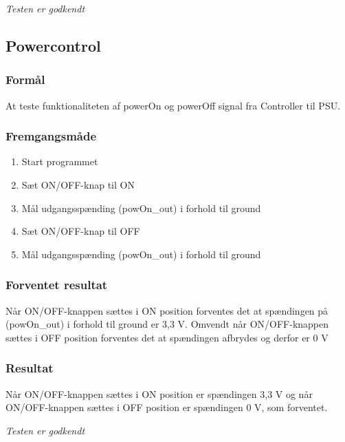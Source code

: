 \textit{Testen er godkendt}

\subsection*{Powercontrol}

\subsubsection*{Formål}
At teste funktionaliteten af powerOn og powerOff signal fra Controller til PSU.

\subsubsection*{Fremgangsmåde}
\begin{enumerate}
\item Start programmet
\item Sæt ON/OFF-knap til ON
\item Mål udgangsspænding (powOn\_out) i forhold til ground
\item Sæt ON/OFF-knap til OFF
\item Mål udgangsspænding (powOn\_out) i forhold til ground

\end{enumerate}

\subsubsection*{Forventet resultat}
Når ON/OFF-knappen sættes i ON position forventes det at spændingen på (powOn\_out) i forhold til ground er 3,3 V. Omvendt når ON/OFF-knappen sættes i OFF position forventes det at spændingen afbrydes og derfor er 0 V

\subsubsection*{Resultat} 
Når ON/OFF-knappen sættes i ON position er spændingen 3,3 V og når ON/OFF-knappen sættes i OFF position er spændingen 0 V, som forventet.

\textit{Testen er godkendt}
